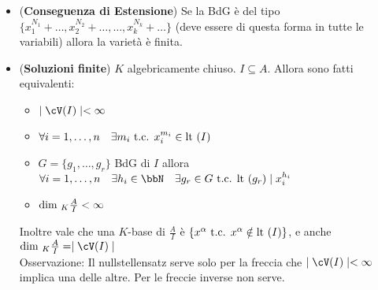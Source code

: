 \documentclass[a4paper,NoNotes,GeneralMath]{stdmdoc}
\newcommand{\Lt}{\text{lt }}
\begin{document}
\begin{itemize}
\begin{itemize}
				\item ({\bf Conseguenza di Estensione}) Se la BdG è del tipo $\{x_1^{N_1} + \ldots, x_2^{N_2} + \ldots, \ldots, x_k^{N_k} + \ldots \}$ (deve essere di questa forma in tutte le variabili) allora la varietà è finita.
				\item ({\bf Soluzioni finite}) $K$ algebricamente chiuso. $I \subseteq A$. Allora sono fatti equivalenti:
					\begin{itemize}
						\item $\mid \cV(I) \mid < \infty$
						\item $\forall i = 1, \ldots, n \quad \exists m_i \tc x_i^{m_i} \in \Lt(I)$
						\item $G = \{ g_1, \ldots, g_r\}$ BdG di $I$ allora $\forall i = 1, \ldots, n \quad \exists h_i \in \bbN \quad \exists g_r \in G \tc \Lt(g_r) \mid x_i^{h_i}$
						\item $\mbox{dim }_K \frac{A}{I} < \infty$
					\end{itemize}
					Inoltre vale che una $K$-base di $\frac{A}{I}$ è $\{x^\alpha \tc x^\alpha \notin \Lt(I)\}$, e anche $\Dim_K \frac{A}{I} = \mid \cV(I) \mid$ \\
					Osservazione: Il nullstellensatz serve solo per la freccia che $\mid \cV(I) \mid < \infty$ implica una delle altre. Per le freccie inverse non serve.
			\end{itemize}
	\end{itemize}
	
\end{document}
